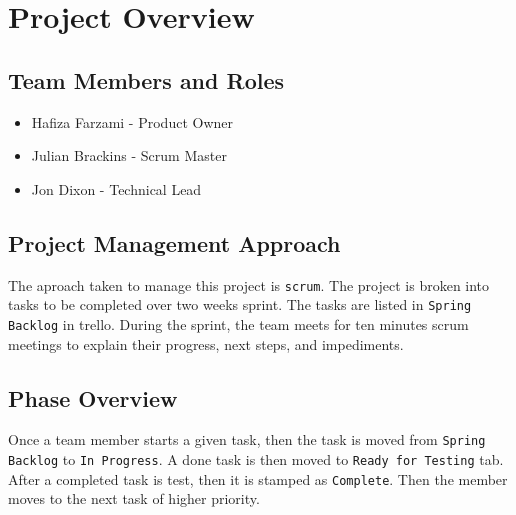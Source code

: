 

\chapter{Project Overview}



\section{Team Members and Roles}

\begin{itemize}
  \item Hafiza Farzami - Product Owner
  \item Julian Brackins - Scrum Master
  \item Jon Dixon - Technical Lead  
\end{itemize}


\section{Project  Management Approach}
The aproach taken to manage this project is {\tt scrum}. The project is broken into tasks to be completed over two weeks sprint. The tasks are listed in {\tt Spring Backlog} in trello. During the sprint, the team meets for ten minutes scrum meetings to explain their progress, next steps, and impediments. 


\section{Phase  Overview}
Once a team member starts a given task, then the task is moved from {\tt Spring Backlog} to {\tt In Progress}. A done task is then moved to {\tt Ready for Testing} tab. After a completed task is test, then it is stamped as {\tt Complete}. Then the member moves to the next task of higher priority.

 \let\cleardoublepage\clearpage
